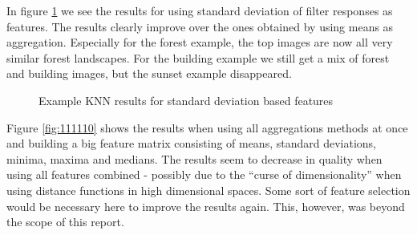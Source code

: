 In figure \ref{fig:010000} we see the results for using standard deviation of filter responses as features. The results clearly improve over the ones obtained by using means as aggregation. Especially for the forest example, the top images are now all very similar forest landscapes. For the building example we still get a mix of forest and building images, but the sunset example disappeared.

\begin{figure}[!hbt]
\centering
{}
\caption{Example KNN results for standard deviation based features}
\label{fig:010000}
\end{figure}

Figure \ref{fig:111110} shows the results when using all aggregations methods at once and building a big feature matrix consisting of means, standard deviations, minima, maxima and medians. The results seem to decrease in quality when using all features combined - possibly due to the ``curse of dimensionality'' when using distance functions in high dimensional spaces. Some sort of feature selection would be necessary here to improve the results again. This, however, was beyond the scope of this report. 

